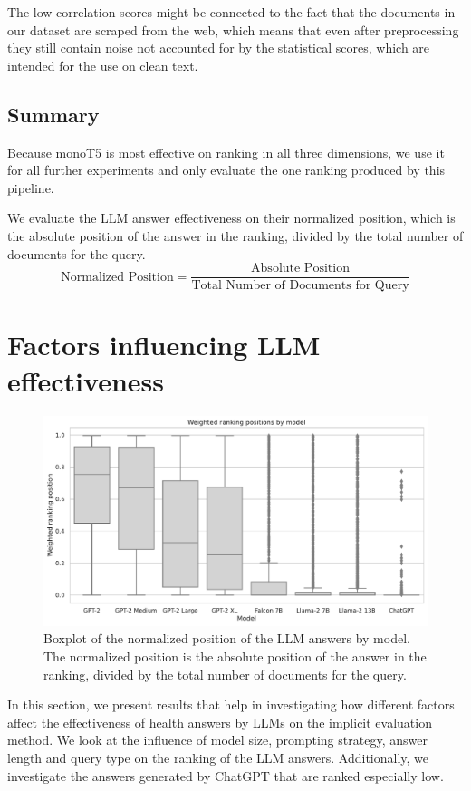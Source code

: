 The low correlation scores might be connected to the fact that the documents in our dataset are scraped from the web, which means that even after preprocessing they still contain noise not accounted for by the statistical scores, which are intended for the use on clean text.

\subsection{Summary}
Because monoT5 is most effective on ranking in all three dimensions, we use it for all further experiments and only evaluate the one ranking produced by this pipeline.

We evaluate the LLM answer effectiveness on their normalized position, which is the absolute position of the answer in the ranking, divided by the total number of documents for the query.
\begin{equation}
    \text{Normalized Position} = \frac{\text{Absolute Position}}{\text{Total Number of Documents for Query}}
\end{equation}
\section{Factors influencing LLM effectiveness}
\begin{figure}[tb]
\centering
\includegraphics[width=\textwidth]{images/weighted_position_boxplot.pdf}
\caption{Boxplot of the normalized position of the LLM answers by model. The normalized position is the absolute position of the answer in the ranking, divided by the total number of documents for the query.}
\label{fig:weighted_position_boxplot}
\end{figure}
In this section, we present results that help in investigating how different factors affect the effectiveness of health answers by LLMs on the implicit evaluation method.
We look at the influence of model size, prompting strategy, answer length and query type on the ranking of the LLM answers.
Additionally, we investigate the answers generated by ChatGPT that are ranked especially low.

